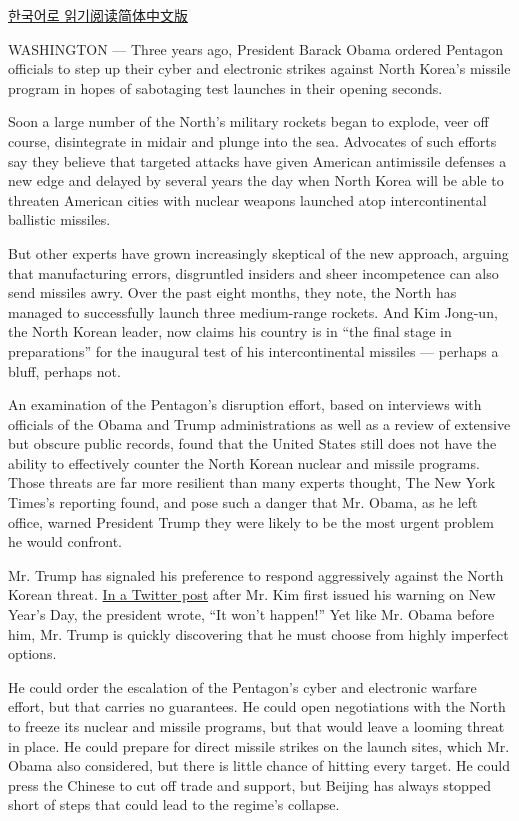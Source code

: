 \href{https://www.nytimes.com/2017/03/04/world/asia/north-korea-missile-program-sabotage-korean.html}{한국어로
읽기}\href{http://cn.nytimes.com/usa/20170304/north-korea-missile-program-sabotage/}{阅读简体中文版}

WASHINGTON --- Three years ago, President Barack Obama ordered Pentagon
officials to step up their cyber and electronic strikes against North
Korea's missile program in hopes of sabotaging test launches in their
opening seconds.

Soon a large number of the North's military rockets began to explode,
veer off course, disintegrate in midair and plunge into the sea.
Advocates of such efforts say they believe that targeted attacks have
given American antimissile defenses a new edge and delayed by several
years the day when North Korea will be able to threaten American cities
with nuclear weapons launched atop intercontinental ballistic missiles.

But other experts have grown increasingly skeptical of the new approach,
arguing that manufacturing errors, disgruntled insiders and sheer
incompetence can also send missiles awry. Over the past eight months,
they note, the North has managed to successfully launch three
medium-range rockets. And Kim Jong-un, the North Korean leader, now
claims his country is in ``the final stage in preparations'' for the
inaugural test of his intercontinental missiles --- perhaps a bluff,
perhaps not.

An examination of the Pentagon's disruption effort, based on interviews
with officials of the Obama and Trump administrations as well as a
review of extensive but obscure public records, found that the United
States still does not have the ability to effectively counter the North
Korean nuclear and missile programs. Those threats are far more
resilient than many experts thought, The New York Times's reporting
found, and pose such a danger that Mr. Obama, as he left office, warned
President Trump they were likely to be the most urgent problem he would
confront.

Mr. Trump has signaled his preference to respond aggressively against
the North Korean threat.
\href{https://www.nytimes.com/2017/01/02/world/asia/trump-twitter-north-korea-missiles-china.html?_r=0}{In
a Twitter post} after Mr. Kim first issued his warning on New Year's
Day, the president wrote, ``It won't happen!'' Yet like Mr. Obama before
him, Mr. Trump is quickly discovering that he must choose from highly
imperfect options.

He could order the escalation of the Pentagon's cyber and electronic
warfare effort, but that carries no guarantees. He could open
negotiations with the North to freeze its nuclear and missile programs,
but that would leave a looming threat in place. He could prepare for
direct missile strikes on the launch sites, which Mr. Obama also
considered, but there is little chance of hitting every target. He could
press the Chinese to cut off trade and support, but Beijing has always
stopped short of steps that could lead to the regime's collapse.

